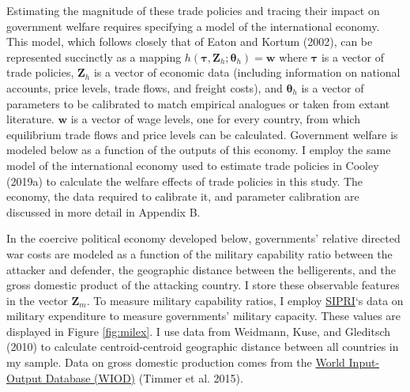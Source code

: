 \documentclass{puthesis}
\begin{document}
Estimating the magnitude of these trade policies and tracing their
impact on government welfare requires specifying a model of the
international economy. This model, which follows closely that of Eaton
and Kortum (2002), can be represented succinctly as a mapping
\(h(\bm{\tau}, \bm{Z}_h; \bm{\theta}_h) = \bm{w}\) where \(\bm{\tau}\)
is a vector of trade policies, \(\bm{Z}_h\) is a vector of economic data
(including information on national accounts, price levels, trade flows,
and freight costs), and \(\bm{\theta}_h\) is a vector of parameters to
be calibrated to match empirical analogues or taken from extant
literature. \(\bm{w}\) is a vector of wage levels, one for every
country, from which equilibrium trade flows and price levels can be
calculated. Government welfare is modeled below as a function of the
outputs of this economy. I employ the same model of the international
economy used to estimate trade policies in Cooley (2019a) to calculate
the welfare effects of trade policies in this study. The economy, the
data required to calibrate it, and parameter calibration are discussed
in more detail in Appendix B.

In the coercive political economy developed below, governments' relative
directed war costs are modeled as a function of the military capability
ratio between the attacker and defender, the geographic distance between
the belligerents, and the gross domestic product of the attacking
country. I store these observable features in the vector \(\bm{Z}_m\).
To measure military capability ratios, I employ
\href{https://www.sipri.org/}{SIPRI}`s data on military expenditure to
measure governments' military capacity. These values are displayed in
Figure \ref{fig:milex}. I use data from Weidmann, Kuse, and Gleditsch
(2010) to calculate centroid-centroid geographic distance between all
countries in my sample. Data on gross domestic production comes from the
\href{http://www.wiod.org/home}{World Input-Output Database (WIOD)}
(Timmer et al. 2015).
\end{document}
